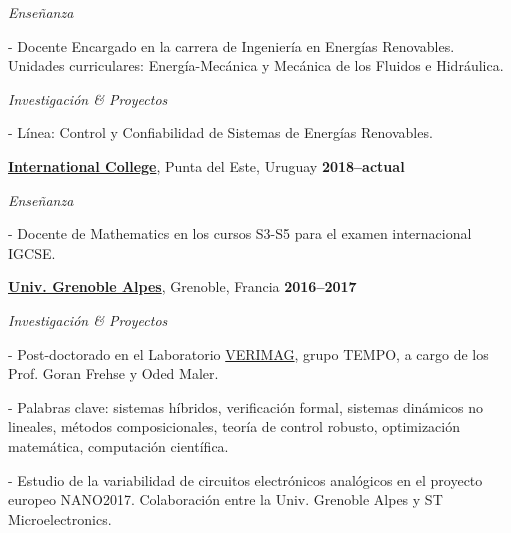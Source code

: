 \documentclass[10pt]{article}
\newenvironment{outerlist}[1][\enskip\textbullet]%
        {\begin{itemize}[#1]}{\end{itemize}%
         \vspace{-.6\baselineskip}}
\newenvironment{innerlist}[1][\enskip\textbullet]%
        {\begin{compactitem}[#1]}{\end{compactitem}}
\newcommand{\blankline}{\quad\pagebreak[2]}
\begin{document}
\begin{outerlist}
	\item[]\textit{Enseñanza}
	\begin{innerlist}
		\item[-] Docente Encargado en la carrera de Ingeniería en Energías Renovables. Unidades curriculares: Energía-Mecánica y Mecánica de los Fluidos e Hidr\'{a}ulica.
	\end{innerlist}
	\item[]\textit{Investigación \& Proyectos}
\begin{innerlist}
	\item[-] L\'{i}nea: Control y Confiabilidad de Sistemas de Energ\'{i}as Renovables.
\end{innerlist}
\end{outerlist}


\blankline

\href{https://ic.edu.uy/}{\textbf{International College}}, Punta del Este, Uruguay
\hfill\textbf{2018--actual}

\begin{outerlist}
	\item[]\textit{Enseñanza}
	\begin{innerlist}
		\item[-] Docente de Mathematics en los cursos S3-S5 para el examen internacional IGCSE.
	\end{innerlist}
\end{outerlist}

\blankline


\href{http://www.ujf-grenoble.fr/}{\textbf{Univ. Grenoble Alpes}}, Grenoble, Francia
\hfill\textbf{2016--2017}

\begin{outerlist}
	\item[]\textit{Investigación \& Proyectos}
	\begin{innerlist}
		\item[-] Post-doctorado en el Laboratorio \href{http://www-verimag.imag.fr/?lang=en}{VERIMAG}, grupo TEMPO, a cargo de los Prof. Goran Frehse y Oded Maler.
		
		\item[-] Palabras clave: sistemas híbridos, verificación formal, sistemas dinámicos no lineales, métodos composicionales, teoría de control robusto, optimización matemática, computación científica.
	
		\item[-] Estudio de la variabilidad de circuitos electrónicos analógicos en el proyecto europeo NANO2017. Colaboración entre la Univ. Grenoble Alpes y ST Microelectronics.
	\end{innerlist}
\end{outerlist}
\end{document}

